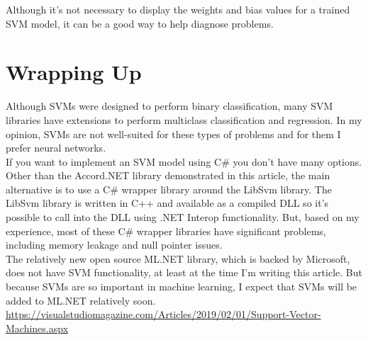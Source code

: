 \documentclass[13pt]{article}
\begin{document}
Although it's not necessary to display the weights and bias values for a trained SVM model, it can be a good way to help diagnose problems.

\section{Wrapping Up}

Although SVMs were designed to perform binary classification, many SVM libraries have extensions to perform multiclass classification and regression. In my opinion, SVMs are not well-suited for these types of problems and for them I prefer neural networks.\\

\noindent
If you want to implement an SVM model using C\# you don't have many options. Other than the Accord.NET library demonstrated in this article, the main alternative is to use a C\# wrapper library around the LibSvm library. The LibSvm library is written in C++ and available as a compiled DLL so it's possible to call into the DLL using .NET Interop functionality. But, based on my experience, most of these C\# wrapper libraries have significant problems, including memory leakage and null pointer issues.\\

\noindent
The relatively new open source ML.NET library, which is backed by Microsoft, does not have SVM functionality, at least at the time I'm writing this article. But because SVMs are so important in machine learning, I expect that SVMs will be added to ML.NET relatively soon.\\

\url{https://visualstudiomagazine.com/Articles/2019/02/01/Support-Vector-Machines.aspx}
\end{document}
